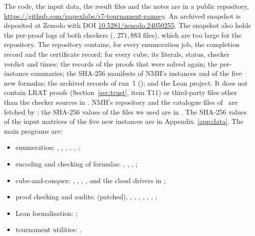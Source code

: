\documentclass[11pt]{amsart}
\theoremstyle{definition}
\theoremstyle{remark}
\begin{document}
The code, the input data, the result files and the notes are in a public
repository, \url{https://github.com/papexlabs/r7-tournament-ramsey}. An
archived snapshot is deposited at Zenodo with DOI
\href{https://doi.org/10.5281/zenodo.24050255}{10.5281/zenodo.24050255}. The
snapshot also holds the per-proof logs of both checkers
(, $271{,}883$ files), which are too large for the
repository. The repository
contains, for every enumeration job, the completion record and the certificate
record; for every cube, its literals, status, checker verdict and times; the
records of the proofs that were solved again; the per-instance summaries; the SHA-256 manifests of NMH's
instances and of the five new formulas; the archived records of run~1
(); and the Lean project. It does not contain LRAT proofs
(Section~\ref{sec:trust}, item T11) or third-party files other than the
checker sources in . NMH's repository and
the catalogue files of~\cite{LLHrepo} are fetched by
; the SHA-256 values of the files we used are in
. The SHA-256 values of the input matrices of the
five new instances are in Appendix~\ref{app:data}. The main programs are:
{\raggedright
\begin{itemize}
\item enumeration: , ,
  , ,
  , ;
\item encoding and checking of formulas: ,
  , ,
  ;
\item cube-and-conquer: ,
  , ,
  , and the cloud drivers in
  ;
\item proof checking and audits: 
  (patched), , ,
  , ,
  , ,
  ;
\item Lean formalisation: ;
\item tournament utilities: .
\end{itemize}}
\end{document}
